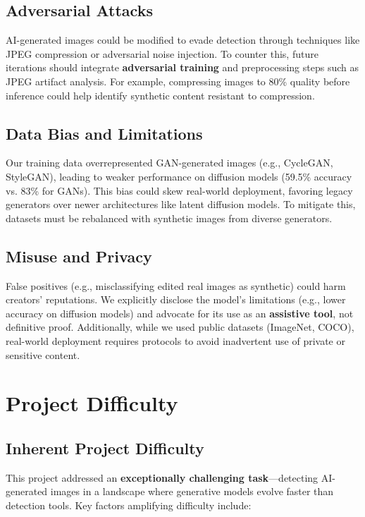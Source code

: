 \documentclass{article} %
\begin{document}
\subsection{Adversarial Attacks}
AI-generated images could be modified to evade detection through techniques like JPEG compression or adversarial noise injection. To counter this, future iterations should integrate \textbf{adversarial training} and preprocessing steps such as JPEG artifact analysis. For example, compressing images to 80\% quality before inference could help identify synthetic content resistant to compression.

\subsection{Data Bias and Limitations}
Our training data overrepresented GAN-generated images (e.g., CycleGAN, StyleGAN), leading to weaker performance on diffusion models (59.5\% accuracy vs. 83\% for GANs). This bias could skew real-world deployment, favoring legacy generators over newer architectures like latent diffusion models. To mitigate this, datasets must be rebalanced with synthetic images from diverse generators.

\subsection{Misuse and Privacy}
False positives (e.g., misclassifying edited real images as synthetic) could harm creators' reputations. We explicitly disclose the model’s limitations (e.g., lower accuracy on diffusion models) and advocate for its use as an \textbf{assistive tool}, not definitive proof. Additionally, while we used public datasets (ImageNet, COCO), real-world deployment requires protocols to avoid inadvertent use of private or sensitive content.


\section{Project Difficulty}

\subsection{Inherent Project Difficulty}
This project addressed an \textbf{exceptionally challenging task}—detecting AI-generated images in a landscape where generative models evolve faster than detection tools. Key factors amplifying difficulty include:
\end{document}
